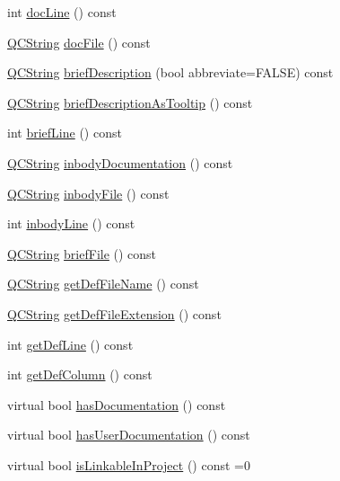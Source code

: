 \begin{DoxyCompactItemize}
\item 
int \hyperlink{class_definition_a3c2a6c87ac432d8a6db51bc52b2379da}{doc\-Line} () const 
\item 
\hyperlink{class_q_c_string}{Q\-C\-String} \hyperlink{class_definition_afadeeb679bb7bda0ad5b4f358f0d33e2}{doc\-File} () const 
\item 
\hyperlink{class_q_c_string}{Q\-C\-String} \hyperlink{class_definition_a84c7fb6a4f2b359bdcaa779ff5635579}{brief\-Description} (bool abbreviate=F\-A\-L\-S\-E) const 
\item 
\hyperlink{class_q_c_string}{Q\-C\-String} \hyperlink{class_definition_abdc2cc8aea016db82f5432401ac10439}{brief\-Description\-As\-Tooltip} () const 
\item 
int \hyperlink{class_definition_aca87df70fcd505c2458a6ad75a1ede61}{brief\-Line} () const 
\item 
\hyperlink{class_q_c_string}{Q\-C\-String} \hyperlink{class_definition_aebb6648f7eccccf1306a4e8189a5944e}{inbody\-Documentation} () const 
\item 
\hyperlink{class_q_c_string}{Q\-C\-String} \hyperlink{class_definition_a69f697410a918873614549085444faa4}{inbody\-File} () const 
\item 
int \hyperlink{class_definition_ae4b412e67989226ad3ce76f08f3ffaad}{inbody\-Line} () const 
\item 
\hyperlink{class_q_c_string}{Q\-C\-String} \hyperlink{class_definition_a14b9cbdcc30535bcfd2e435667dea5fe}{brief\-File} () const 
\item 
\hyperlink{class_q_c_string}{Q\-C\-String} \hyperlink{class_definition_a15571178c7169aca27071a81b64d5a90}{get\-Def\-File\-Name} () const 
\item 
\hyperlink{class_q_c_string}{Q\-C\-String} \hyperlink{class_definition_aaa008a94c11636ae0724d216a9a93eb6}{get\-Def\-File\-Extension} () const 
\item 
int \hyperlink{class_definition_ad0cd42d7ec8233af1c414312feaf9dc2}{get\-Def\-Line} () const 
\item 
int \hyperlink{class_definition_a7b5b9b0cf12b422bc40a5e5a3aa47489}{get\-Def\-Column} () const 
\item 
virtual bool \hyperlink{class_definition_a585dcd381ab70014568db8ad457fc8b1}{has\-Documentation} () const 
\item 
virtual bool \hyperlink{class_definition_af1f0e7584db0d4b918f9c55c9c8ab80a}{has\-User\-Documentation} () const 
\item 
virtual bool \hyperlink{class_definition_a2a4aa56e5209c7fbed15d5c3a3791643}{is\-Linkable\-In\-Project} () const =0

\end{DoxyCompactItemize}
